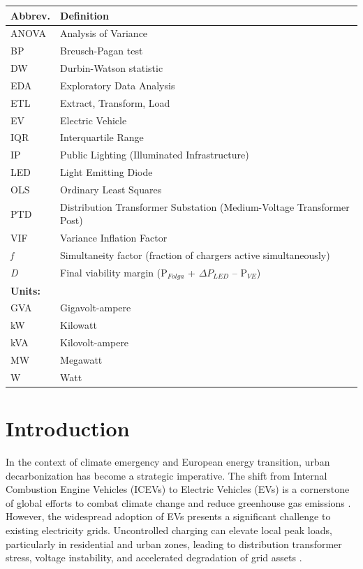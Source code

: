 \documentclass[conference]{IEEEtran}
\begin{document}
\begin{table}[htbp]
\centering
\small
\begin{tabular}{p{}p{}}
\toprule
\textbf{Abbrev.} & \textbf{Definition} \\
\midrule
ANOVA & Analysis of Variance \\
BP & Breusch-Pagan test \\
DW & Durbin-Watson statistic \\
EDA & Exploratory Data Analysis \\
ETL & Extract, Transform, Load \\
EV & Electric Vehicle \\
IQR & Interquartile Range \\
IP & Public Lighting (Illuminated Infrastructure) \\
LED & Light Emitting Diode \\
OLS & Ordinary Least Squares \\
PTD & Distribution Transformer Substation (Medium-Voltage Transformer Post) \\
VIF & Variance Inflation Factor \\
\textit{f} & Simultaneity factor (fraction of chargers active simultaneously) \\
\textit{D} & Final viability margin (P$_{Folga}$ + $\Delta P_{LED}$ -- P$_{VE}$) \\
\midrule
\textbf{Units:} & \\
GVA & Gigavolt-ampere \\
kW & Kilowatt \\
kVA & Kilovolt-ampere \\
MW & Megawatt \\
W & Watt \\
\bottomrule
\end{tabular}
\end{table}

\section{Introduction}

In the context of climate emergency and European energy transition, urban decarbonization has become a strategic imperative. The shift from Internal Combustion Engine Vehicles (ICEVs) to Electric Vehicles (EVs) is a cornerstone of global efforts to combat climate change and reduce greenhouse gas emissions \cite{Saldarini2024}. However, the widespread adoption of EVs presents a significant challenge to existing electricity grids. Uncontrolled charging can elevate local peak loads, particularly in residential and urban zones, leading to distribution transformer stress, voltage instability, and accelerated degradation of grid assets \cite{Aires2025,Rahman2023}.
\end{document}
